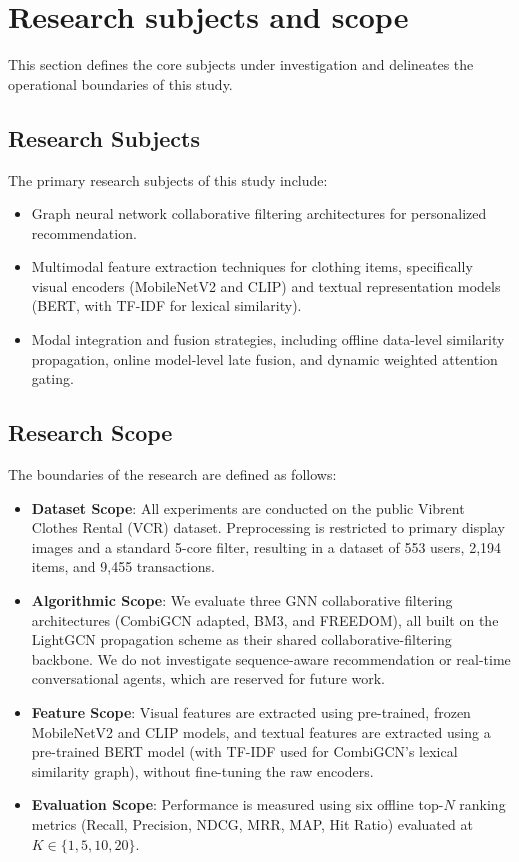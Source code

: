 \section{Research subjects and scope}

This section defines the core subjects under investigation and delineates the operational boundaries of this study.

\subsection{Research Subjects}

The primary research subjects of this study include:
\begin{itemize}
    \item Graph neural network collaborative filtering architectures for personalized recommendation.
    \item Multimodal feature extraction techniques for clothing items, specifically visual encoders (MobileNetV2 and CLIP) and textual representation models (BERT, with TF-IDF for lexical similarity).
    \item Modal integration and fusion strategies, including offline data-level similarity propagation, online model-level late fusion, and dynamic weighted attention gating.
\end{itemize}

\subsection{Research Scope}

The boundaries of the research are defined as follows:
\begin{itemize}
    \item \textbf{Dataset Scope}: All experiments are conducted on the public Vibrent Clothes Rental (VCR) dataset. Preprocessing is restricted to primary display images and a standard 5-core filter, resulting in a dataset of 553 users, 2,194 items, and 9,455 transactions.
    \item \textbf{Algorithmic Scope}: We evaluate three GNN collaborative filtering architectures (CombiGCN adapted, BM3, and FREEDOM), all built on the LightGCN propagation scheme as their shared collaborative-filtering backbone. We do not investigate sequence-aware recommendation or real-time conversational agents, which are reserved for future work.
    \item \textbf{Feature Scope}: Visual features are extracted using pre-trained, frozen MobileNetV2 and CLIP models, and textual features are extracted using a pre-trained BERT model (with TF-IDF used for CombiGCN's lexical similarity graph), without fine-tuning the raw encoders.
    \item \textbf{Evaluation Scope}: Performance is measured using six offline top-$N$ ranking metrics (Recall, Precision, NDCG, MRR, MAP, Hit Ratio) evaluated at $K \in \{1, 5, 10, 20\}$.
\end{itemize}
